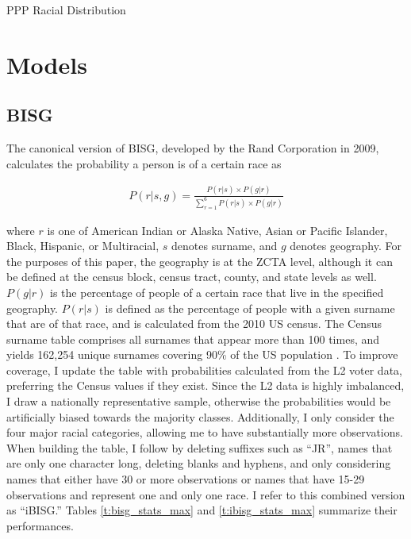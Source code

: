 \documentclass[12pt]{article}
\begin{document}
\begin{table}[h]
    \caption{PPP Racial Distribution}
    \label{tab:ppp_racial_distribution}
    \centering
    
\end{table}


\section{Models}

\subsection{BISG} \label{subsec:bisg}

The canonical version of BISG, developed by the Rand Corporation in 2009, calculates the probability a person is of a certain race as

\begin{align*}
    P(r | s, g) = \frac{P(r | s) \times P(g | r)}{\sum_{r=1}^{6} P(r | s) \times P(g | r)}
\end{align*} 

where \( r \) is one of  American Indian or Alaska Native, Asian or Pacific Islander, Black, Hispanic, or Multiracial, \( s \) denotes surname, and \( g \) denotes geography. For the purposes of this paper, the geography is at the ZCTA level, although it can be defined at the census block, census tract, county, and state levels as well. \( P(g | r) \) is the percentage of people of a certain race that live in the specified geography. \( P(r | s) \) is defined as the percentage of people with a given surname that are of that race, and is calculated from the 2010 US census. The Census surname table comprises all surnames that appear more than 100 times, and yields 162,254 unique surnames covering 90\% of the US population \cite{census2010surnames}. To improve coverage, I update the table with probabilities calculated from the L2 voter data, preferring the Census values if they exist. Since the L2 data is highly imbalanced, I draw a nationally representative sample, otherwise the probabilities would be artificially biased towards the majority classes. Additionally, I only consider the four major racial categories, allowing me to have substantially more observations.
When building the table, I follow \cite{tzioumis2018} by deleting suffixes such as ``JR'', names that are only one character long, deleting blanks and hyphens, and only considering names that either have 30 or more observations or names that have 15-29 observations and represent one and only one race. I refer to this combined version as ``iBISG.'' Tables \ref{t:bisg_stats_max} and \ref{t:ibisg_stats_max} summarize their performances.
\end{document}

